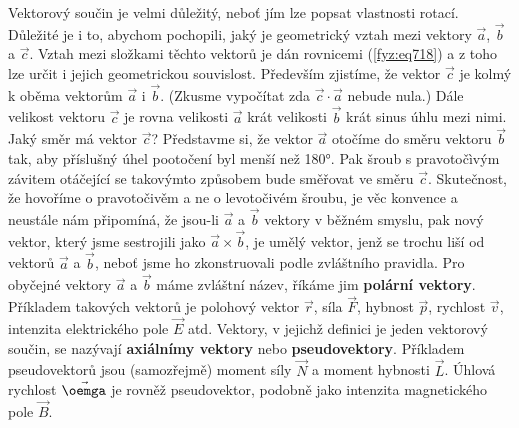     Vektorový součin je velmi důležitý, neboť jím lze popsat vlastnosti rotací. Důležité je i to,
    abychom pochopili, jaký je geometrický vztah mezi vektory \(\vec{a}\), \(\vec{b}\) a
    \(\vec{c}\). Vztah mezi složkami těchto vektorů je dán rovnicemi (\ref{fyz:eq718}) a z toho lze
    určit i jejich geometrickou souvislost. Především zjistíme, že vektor \(\vec{c}\) je kolmý k
    oběma vektorům \(\vec{a}\) i \(\vec{b}\). (Zkusme vypočítat zda \(\vec{c}\cdot\vec{a}\) nebude
    nula.) Dále velikost vektoru \(\vec{c}\) je rovna velikosti \(\vec{a}\) krát velikosti
    \(\vec{b}\) krát sinus úhlu mezi nimi. Jaký směr má vektor \(\vec{c}\)? Představme si, že vektor
    \(\vec{a}\) otočíme do směru vektoru \(\vec{b}\) tak, aby příslušný úhel pootočení byl menší než
    \ang{180}. Pak šroub s pravotočìvým závitem otáčející se takovýmto způsobem bude směřovat ve
    směru \(\vec{c}\). Skutečnost, že hovoříme o pravotočivěm a ne o levotočivém šroubu, je věc
    konvence a neustále nám připomíná, že jsou-li \(\vec{a}\) a \(\vec{b}\)  vektory v
    běžném smyslu, pak nový vektor, který jsme sestrojili jako \(\vec{a}\times\vec{b}\), je umělý
    vektor, jenž se trochu liší od vektorů \( \vec{a}\) a \(\vec{b}\), neboť jsme ho zkonstruovali
    podle zvláštního pravidla. Pro obyčejné vektory \(\vec{a}\) a \(\vec{b}\) máme zvláštní název,
    říkáme jim \textbf{polární vektory}. Příkladem takových vektorů je polohový vektor \(\vec{r}\),
    síla \(\vec{F}\), hybnost \(\vec{p}\), rychlost \(\vec{v}\), intenzita elektrického pole
    \(\vec{E}\) atd. Vektory, v jejichž definici je jeden vektorový součin, se nazývají
    \textbf{axiálnímy vektory} nebo \textbf{pseudovektory}. Příkladem pseudovektorů jsou
    (samozřejmě) moment síly \(\vec{N}\) a moment hybnosti \(\vec{L}\). Úhlová rychlost
    \(\vec{\oemga}\) je rovněž pseudovektor, podobně jako intenzita magnetického pole \(\vec{B}\).


